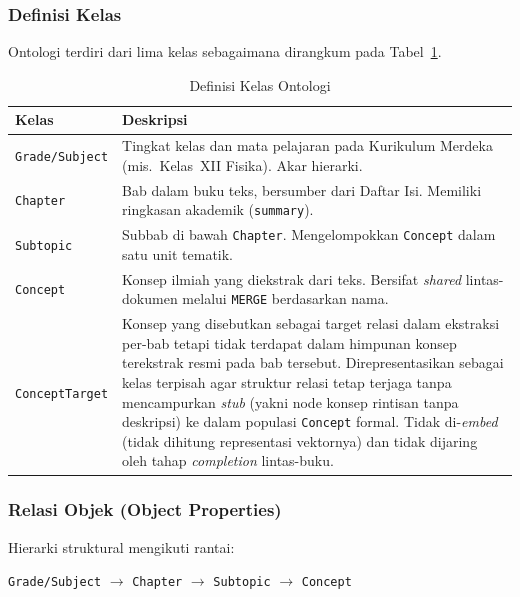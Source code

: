 \documentclass[../../thesis]{subfiles}
\begin{document}
\subsubsection*{Definisi Kelas}

Ontologi terdiri dari lima kelas sebagaimana dirangkum pada
Tabel~\ref{tab:kelas-ontologi}.

\begin{table}[htbp]
  \centering
  \renewcommand{\arraystretch}{1.3}
  \caption{Definisi Kelas Ontologi}
  \label{tab:kelas-ontologi}
  \begin{tabularx}{\textwidth}{@{}lX@{}}
    \toprule
    \textbf{Kelas} & \textbf{Deskripsi} \\
    \midrule
    \texttt{Grade/Subject}
      & Tingkat kelas dan mata pelajaran pada Kurikulum Merdeka
        (mis.\ Kelas~XII Fisika). Akar hierarki. \\
    \texttt{Chapter}
      & Bab dalam buku teks, bersumber dari Daftar Isi.
        Memiliki ringkasan akademik (\texttt{summary}). \\
    \texttt{Subtopic}
      & Subbab di bawah \texttt{Chapter}.
        Mengelompokkan \texttt{Concept} dalam satu unit tematik. \\
    \texttt{Concept}
      & Konsep ilmiah yang diekstrak dari teks.
        Bersifat \textit{shared} lintas-dokumen melalui
        \texttt{MERGE} berdasarkan nama. \\
    \texttt{ConceptTarget}
      & Konsep yang disebutkan sebagai target relasi dalam ekstraksi
        per-bab tetapi tidak terdapat dalam himpunan konsep
        terekstrak resmi pada bab tersebut. Direpresentasikan sebagai
        kelas terpisah agar struktur relasi tetap terjaga tanpa
        mencampurkan \textit{stub} (yakni node konsep rintisan tanpa
        deskripsi) ke dalam populasi \texttt{Concept} formal. Tidak
        di-\textit{embed} (tidak dihitung representasi vektornya) dan tidak
        dijaring oleh tahap \textit{completion} lintas-buku. \\
    \bottomrule
  \end{tabularx}
\end{table}

\subsubsection*{Relasi Objek (Object Properties)}

Hierarki struktural mengikuti rantai:

\begin{center}
  \texttt{Grade/Subject} $\rightarrow$ \texttt{Chapter}
  $\rightarrow$ \texttt{Subtopic} $\rightarrow$ \texttt{Concept}
\end{center}
\end{document}
